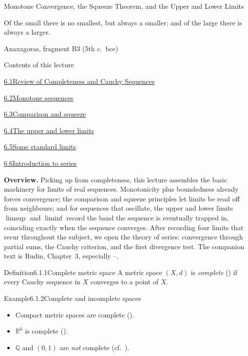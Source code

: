 \documentclass[main.tex]{subfiles}
\begin{document}
%
  {Monotone Convergence, the Squeeze Theorem, and the Upper and Lower Limits}

\epigraph{Of the small there is no smallest, but always a smaller; and of the large
there is always a larger.}{Anaxagoras, fragment B3 (5th c.\ bce)}

\begin{lecturecontents}{Contents of this lecture}
  \item \hyperlink{6.1}{6.1\quad Review of Completeness and Cauchy Sequences}
  \item \hyperlink{6.2}{6.2\quad Monotone sequences}
  \item \hyperlink{6.3}{6.3\quad Comparison and squeeze}
  \item \hyperlink{6.4}{6.4\quad The upper and lower limits}
  \item \hyperlink{6.5}{6.5\quad Some standard limits}
  \item \hyperlink{6.6}{6.6\quad Introduction to series}
\end{lecturecontents}

\bigskip
\noindent\textbf{Overview.} Picking up from completeness, this lecture assembles the basic
machinery for limits of real sequences. Monotonicity plus boundedness already forces
convergence; the comparison and squeeze principles let limits be read off from neighbours;
and for sequences that oscillate, the upper and lower limits $\limsup$ and $\liminf$ record
the band the sequence is eventually trapped in, coinciding exactly when the sequence
converges. After recording four limits that recur throughout the subject, we open the theory
of series: convergence through partial sums, the Cauchy criterion, and the first divergence test.
The companion text is Rudin, Chapter~3, especially --.

\clearpage

\begin{Obj}{Definition}{6.1.1}{Complete metric space}
A metric space $(X,d)$ is \emph{complete} () if every Cauchy sequence in $X$
converges to a point of $X$.
\end{Obj}

\begin{ObjL}{Example}{6.1.2}{Complete and incomplete spaces}
\begin{itemize}[leftmargin=1.3em,topsep=2pt,itemsep=1pt,label=\textbullet]
  \item Compact metric spaces are complete ().
  \item $\mathbb R^k$ is complete ().
  \item $\mathbb Q$ and $(0,1)$ are \emph{not} complete (cf.\ ).
\end{itemize}
\end{ObjL}
\end{document}
